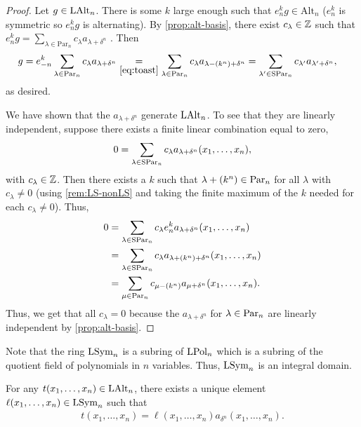 \documentclass[11pt]{amsart}
\begin{document}
\begin{proof}
    Let $g \in \mathrm{LAlt}_n$. There is some $k$ large enough such that $e_{n}^kg \in \mathrm{Alt}_n$ ($e_{n}^k$ is symmetric so $e_{n}^kg$ is alternating). By \cref{prop:alt-basis}, there exist $c_\lambda \in \mathbb{Z}$ such that $e_{n}^k g=\sum_{\lambda \in \mathrm{Par}_n} c_\lambda a_{\lambda+\delta^n}$  . Then \begin{align*}
        g&=e_{-n}^k\sum_{\lambda \in \mathrm{Par}_n} c_\lambda a_{\lambda+\delta^n} \underset{\cref{eq:toast}}{=}\sum_{\lambda \in \mathrm{Par}_n} c_\lambda a_{\lambda-(k^n)+\delta^n} = \sum_{\lambda ' \in \mathrm{SPar}_n} c_{\lambda '} a_{\lambda ' +\delta^n},
    \end{align*}
    as desired.

    We have shown that the $a_{\lambda + \delta^n}$ generate $\mathrm{LAlt}_n$. To see that they are linearly independent, suppose there exists a finite linear combination equal to zero,
    \begin{align*}
        0 = \sum_{\lambda \in \mathrm{SPar}_n} c_\lambda a_{\lambda+\delta^n}(x_1, \dots , x_n ),
    \end{align*}
    with $c_\lambda \in \mathbb{Z}$. Then there exists a $k$ such that $\lambda + (k^n) \in \mathrm{Par}_n$ for all $\lambda$ with $c_\lambda \neq 0$ (using \cref{rem:LS-nonLS} and taking the finite maximum of the \(k\) needed for each \(c_\lambda \neq 0\)). Thus, 
    \begin{align*}
        0 &= \sum_{\lambda \in \mathrm{SPar}_n} c_\lambda e_n ^k a_{\lambda + \delta^n}(x_1, \ldots ,x_n)  \\
        &= \sum_{\lambda \in \mathrm{SPar}_n } c_\lambda a_{\lambda + (k^n) + \delta^n} (x_1, \ldots ,x_n) \\
        &= \sum_{\mu \in \mathrm{Par}_n} c_{\mu - (k^n)} a_{\mu + \delta^n}(x_1, \ldots , x_n).
    \end{align*}
    Thus, we get that all $c_\lambda = 0$ because the $a_{\lambda+\delta^n}$ for $\lambda \in \mathrm{Par}_n$ are linearly independent by \cref{prop:alt-basis}. 
\end{proof}

\begin{rem} \label{rem:integral}
    Note that the ring \(\mathrm{LSym}_n\) is a subring of \(\mathrm{LPol}_n\) which is a subring of the quotient field of polynomials in \(n\) variables. Thus, \(\mathrm{LSym}_n\) is an integral domain.
\end{rem}

\begin{lem}\label{lem:vandermond}
    For any \(t(x_1,\dots,x_n) \in \mathrm{LAlt}_n\), there exists a unique element \(\ell(x_1,\dots,x_n) \in \mathrm{LSym}_n\) such that
    \begin{align}
        t(x_1,\dots,x_n) =\ell(x_1,\dots,x_n)a_{\delta^n}(x_1,\dots,x_n).
    \end{align}
\end{lem}
\end{document}
